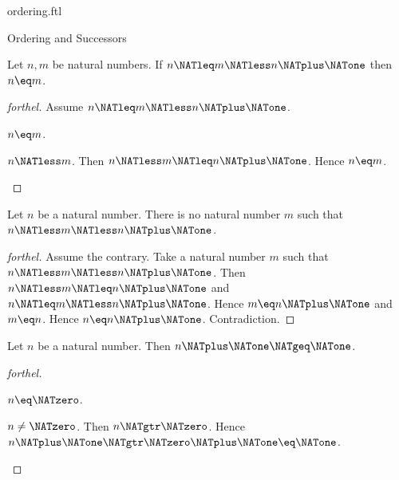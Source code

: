 \documentclass{naproche-library}
\begin{document}
\begin{smodule}[title=The Standard Ordering of the Natural Numbers]{ordering.ftl}
\begin{sfragment}{Ordering and Successors}
  \begin{proposition}[forthel,id=ARITHMETIC_04_8792330561650688]
    Let $n, m$ be natural numbers.
    If $n \NATleq m \NATless n \NATplus \NATone$ then $n \eq m$.
  \end{proposition}
  \begin{proof}[forthel]
    Assume $n \NATleq m \NATless n \NATplus \NATone$.

    \begin{case}{$n \eq m$.} \end{case}

    \begin{case}{$n \NATless m$.}
      Then $n \NATless m \NATleq n \NATplus \NATone$.
      Hence $n \eq m$.
    \end{case}
  \end{proof}

  \begin{corollary}[forthel,id=ARITHMETIC_04_1802826644717568]
    Let $n$ be a natural number.
    There is no natural number $m$ such that $n \NATless m \NATless n \NATplus \NATone$.
  \end{corollary}
  \begin{proof}[forthel]
    Assume the contrary.
    Take a natural number $m$ such that $n \NATless m \NATless n \NATplus \NATone$.
    Then $n \NATless m \NATleq n \NATplus \NATone$ and $n \NATleq m \NATless n \NATplus \NATone$.
    Hence $m \eq n \NATplus \NATone$ and $m \eq n$.
    Hence $n \eq n \NATplus \NATone$.
    Contradiction.
  \end{proof}

  \begin{proposition}[forthel,id=ARITHMETIC_04_990407185924096]
    Let $n$ be a natural number.
    Then $n \NATplus \NATone \NATgeq \NATone$.
  \end{proposition}
  \begin{proof}[forthel]
    \begin{case}{$n \eq \NATzero$.} \end{case}

    \begin{case}{$n \neq \NATzero$.}
      Then $n \NATgtr \NATzero$.
      Hence $n \NATplus \NATone \NATgtr \NATzero \NATplus \NATone \eq \NATone$.
    \end{case}
  \end{proof}
\end{sfragment}


\end{smodule}
\end{document}
